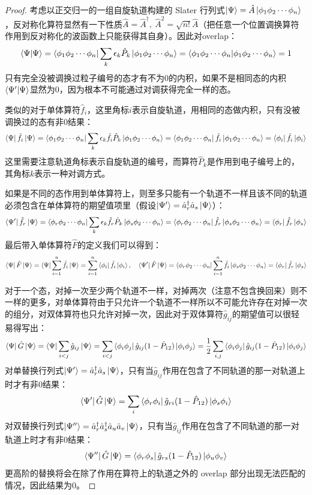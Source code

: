 \begin{proof}
考虑以正交归一的一组自旋轨道构建的 Slater 行列式$\ket{\Psi}=\hat{A}\ket{\phi_1\phi_2\cdots\phi_n}$，反对称化算符显然有一下性质$\hat{A}=\hat{A}^{\dagger}, \ \hat{A}^2=\sqrt{n!}\hat{A}$（把任意一个位置调换算符作用到反对称化的波函数上只能获得其自身）。因此对overlap：
\[\bra{\Psi}\ket{\Psi}=\bra{\phi_1\phi_2\cdots\phi_n}\sum_k\epsilon_k\hat{P}_k\ket{\phi_1\phi_2\cdots\phi_n}=\bra{\phi_1\phi_2\cdots\phi_n}\ket{\phi_1\phi_2\cdots\phi_n}=1\]
只有完全没被调换过粒子编号的态才有不为0的内积，如果不是相同态的内积$\bra{\Psi'}\ket{\Psi}$显然为0，因为根本不可能通过对调获得完全一样的态。

类似的对于单体算符$\hat{f}_i$，这里角标$i$表示自旋轨道，用相同的态做内积，只有没被调换过的态有非0结果：
\[\bra{\Psi}\hat{f}_i\ket{\Psi}=\bra{\phi_1\phi_2\cdots\phi_n}\sum_k\epsilon_k\hat{f}_i\hat{P}_k\ket{\phi_1\phi_2\cdots\phi_n}=\bra{\phi_1\phi_2\cdots\phi_n}\hat{f}_i\ket{\phi_1\phi_2\cdots\phi_n}=\bra{\phi_i}\hat{f}_i\ket{\phi_i}\]
这里需要注意轨道角标表示自旋轨道的编号，而算符$\hat{P}_k$是作用到电子编号上的，其角标$k$表示一种对调方式。

如果是不同的态作用到单体算符上，则至多只能有一个轨道不一样且该不同的轨道必须包含在单体算符的期望值项里（假设$\ket{\Psi'}=\hat{a}_r^{\dagger}\hat{a}_s\ket{\Psi}$）：
\[\bra{\Psi'}\hat{f}_r\ket{\Psi}=\bra{\phi_r\phi_2\cdots\phi_n}\sum_k\epsilon_k\hat{f}_r\hat{P}_k\ket{\phi_s\phi_2\cdots\phi_n}=\bra{\phi_r\phi_2\cdots\phi_n}\hat{f}_r\ket{\phi_s\phi_2\cdots\phi_n}=\bra{\phi_r}\hat{f}_r\ket{\phi_s}\]
最后带入单体算符$\hat{F}$的定义我们可以得到：
\[\bra{\Psi}\hat{F}\ket{\Psi}=\bra{\Psi}\sum_{i=1}^{n}\hat{f}_i\ket{\Psi}=\sum_{i=1}^{n}\bra{\phi_i}\hat{f}_i\ket{\phi_i}, \quad \bra{\Psi'}\hat{F}\ket{\Psi}=\bra{\phi_r\phi_2\cdots\phi_n}\sum_{i=1}^{n}\hat{f}_i\ket{\phi_s\phi_2\cdots\phi_n}=\bra{\phi_r}\hat{f}_r\ket{\phi_s}\]

对于一个态，对掉一次至少两个轨道不一样，对掉两次（注意不包含换回来）则不一样的更多，对单体算符由于只允许一个轨道不一样所以不可能允许存在对掉一次的组分，对双体算符也只允许对掉一次，因此对于双体算符$\hat{g}_{ij}$的期望值可以很轻易得写出：
\[\bra{\Psi}\hat{G}\ket{\Psi}=\bra{\Psi}\sum_{i<j}\hat{g}_{ij}\ket{\Psi}=\sum_{i<j}\bra{\phi_i\phi_j}\hat{g}_{ij}(1-\hat{P}_{12})\ket{\phi_i\phi_j}=\frac{1}{2}\sum_{i,j}\bra{\phi_i\phi_j}\hat{g}_{ij}(1-\hat{P}_{12})\ket{\phi_i\phi_j}\]
对单替换行列式$\ket{\Psi'}=\hat{a}_r^{\dagger}\hat{a}_s\ket{\Psi}$，只有当$\hat{g}_{ij}$作用在包含了不同轨道的那一对轨道上时才有非0结果：
\[\bra{\Psi'}\hat{G}\ket{\Psi}=\sum_{i}\bra{\phi_r\phi_i}\hat{g}_{ri}(1-\hat{P}_{12})\ket{\phi_s\phi_i}\]
对双替换行列式$\ket{\Psi''}=\hat{a}_r^{\dagger}\hat{a}_s^{\dagger}\hat{a}_u\hat{a}_v\ket{\Psi}$，只有当$\hat{g}_{ij}$作用在包含了不同轨道的那一对轨道上时才有非0结果：
\[\bra{\Psi''}\hat{G}\ket{\Psi}=\bra{\phi_r\phi_s}\hat{g}_{rs}(1-\hat{P}_{12})\ket{\phi_u\phi_v}\]
更高阶的替换将会在除了作用在算符上的轨道之外的 overlap 部分出现无法匹配的情况，因此结果为0。
\end{proof}

